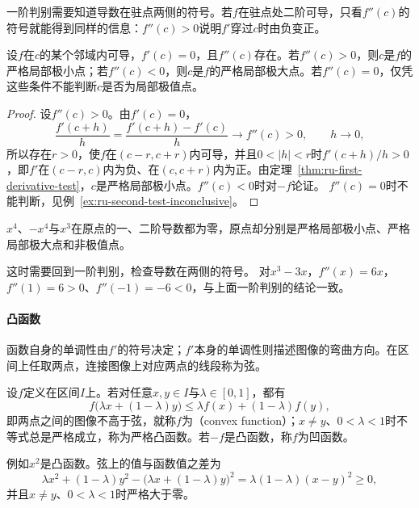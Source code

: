 一阶判别需要知道导数在驻点两侧的符号。若$f$在驻点处二阶可导，只看$f''(c)$的符号就能得到同样的信息：$f''(c)>0$说明$f'$穿过$c$时由负变正。
\begin{theorem}[驻点的二阶判别]
\label{thm:ru-second-derivative-test}
设$f$在$c$的某个邻域内可导，$f'(c)=0$，且$f''(c)$存在。若$f''(c)>0$，则$c$是$f$的严格局部极小点；若$f''(c)<0$，则$c$是$f$的严格局部极大点。若$f''(c)=0$，仅凭这些条件不能判断$c$是否为局部极值点。
\end{theorem}
\begin{proof}
设$f''(c)>0$。由$f'(c)=0$，
\[
 \frac{f'(c+h)}h=\frac{f'(c+h)-f'(c)}h\to f''(c)>0,\qquad h\to0,
\]
所以存在$r>0$，使$f$在$(c-r,c+r)$内可导，并且$0<|h|<r$时$f'(c+h)/h>0$，即$f'$在$(c-r,c)$内为负、在$(c,c+r)$内为正。由定理~\ref{thm:ru-first-derivative-test}，$c$是严格局部极小点。$f''(c)<0$时对$-f$论证。
$f''(c)=0$时不能判断，见例~\ref{ex:ru-second-test-inconclusive}。
\end{proof}
\begin{example}[二阶判别失效的三个函数]
\label{ex:ru-second-test-inconclusive}
$x^4$、$-x^4$与$x^3$在原点的一、二阶导数都为零，原点却分别是严格局部极小点、严格局部极大点和非极值点。
\end{example}
这时需要回到一阶判别，检查导数在两侧的符号。
对$x^3-3x$，$f''(x)=6x$，$f''(1)=6>0$、$f''(-1)=-6<0$，与上面一阶判别的结论一致。

\paragraph{凸函数}
函数自身的单调性由$f'$的符号决定；$f'$本身的单调性则描述图像的弯曲方向。在区间上任取两点，连接图像上对应两点的线段称为弦。
\begin{definition}[凸函数]
\label{def:ru-convex-function}
设$f$定义在区间$I$上。若对任意$x,y\in I$与$\lambda\in[0,1]$，都有
\[
 f\bigl(\lambda x+(1-\lambda)y\bigr)\leq\lambda f(x)+(1-\lambda)f(y),
\]
即两点之间的图像不高于弦，就称$f$为（convex function）；$x\neq y$、$0<\lambda<1$时不等式总是严格成立，称为严格凸函数。若$-f$是凸函数，称$f$为凹函数。
\end{definition}
例如$x^2$是凸函数。弦上的值与函数值之差为
\[
 \lambda x^2+(1-\lambda)y^2-\bigl(\lambda x+(1-\lambda)y\bigr)^2=\lambda(1-\lambda)(x-y)^2\geq0,
\]
并且$x\neq y$、$0<\lambda<1$时严格大于零。

